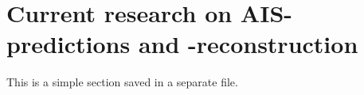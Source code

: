
\section{Current research on AIS-predictions and -reconstruction}
\begin{info}{}
	This is a simple section saved in a separate file.
\end{info}







